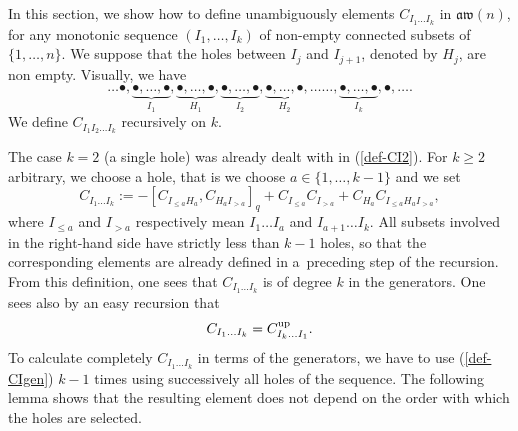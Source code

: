 \documentclass[10pt,a4paper]{amsart}
\numberwithin{equation}{section}
\theoremstyle{definition}
\newcommand{\aw}{\mathfrak{aw}(n)}
\begin{document}
In this section, we show how to define unambiguously elements $C_{I_1\dots I_k}$ in $\aw$, for any monotonic sequence $(I_1,\dots, I_k)$ of non-empty connected subsets of $\{1,\dots,n\}$.
We suppose that the holes between $I_{j}$ and $I_{j+1}$, denoted by $H_j$, are non empty.
Visually, we have
\[\ldots \bullet,\underbrace{\bullet,\dots,\bullet}_{I_1},\underbrace{\bullet,\dots,\bullet}_{H_1},\underbrace{\bullet,\dots,\bullet}_{I_2},\underbrace{\bullet,\dots,\bullet}_{H_2},\ldots\ldots ,\underbrace{\bullet,\dots,\bullet}_{I_{k}},\bullet,\ldots .\]
We define $C_{I_1I_2\dots I_k}$ recursively on $k$.



The case $k=2$ (a single hole) was already dealt with in (\ref{def-CI2}). For $k\geq 2$ arbitrary, we choose a hole, that is we choose $a\in\{1,\dots,k-1\}$ and we set
\begin{equation}\label{def-CIgen}
C_{I_1\dots I_k}:=-[C_{I_{\leq a}H_a},C_{H_aI_{>a}}]_q+C_{I_{\leq a}}C_{I_{>a}}+C_{H_a}C_{I_{\leq a}H_aI_{>a}} ,
\end{equation}
where $I_{\leq a}$ and $I_{>a}$ respectively mean $I_1\dots I_a$ and $I_{a+1}\dots I_k$. All subsets involved in the right-hand side have strictly less than $k-1$ holes,
so that the corresponding elements are already defined in a~preceding step of the recursion.
From this definition, one sees that $C_{I_1\dots I_k}$ is of degree $k$ in the generators. One sees also by an easy recursion that
\[ C_{I_1\dots I_k}=C_{I_k\dots I_1}^{\rm up} .\]
To calculate completely $C_{I_1\dots I_k}$ in terms of the generators, we have to use (\ref{def-CIgen}) $k-1$ times using successively all holes of the sequence.
The following lemma shows that the resulting element does not depend on the order with which the holes are selected.
\end{document}

